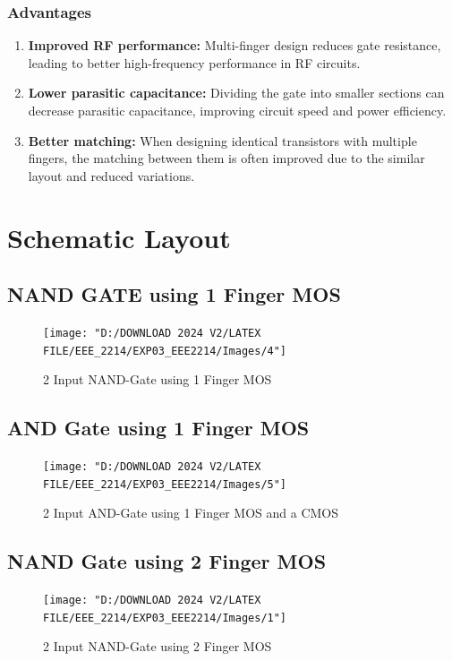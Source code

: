 \documentclass[a4paper,12pt]{article}
\begin{document}
	\subsubsection{Advantages}
	\begin{enumerate}
\item 	\textbf{Improved RF performance:} Multi-finger design reduces gate resistance, leading to better high-frequency performance in RF circuits. 
\item 	\textbf{Lower parasitic capacitance:} Dividing the gate into smaller sections can decrease parasitic capacitance, improving circuit speed and power efficiency. 
\item \textbf{	Better matching:} When designing identical transistors with multiple fingers, the matching between them is often improved due to the similar layout and reduced variations.
	\end{enumerate}

	


	\newpage
	\section{Schematic Layout }
	\subsection{NAND GATE using 1 Finger MOS}
	\begin{figure}[H]
		\centering
		\texttt{[image: "D:/DOWNLOAD 2024 V2/LATEX FILE/EEE\_2214/EXP03\_EEE2214/Images/4"]}
		\caption{2 Input NAND-Gate using 1 Finger MOS}
		\label{fig:4}
	\end{figure}
	
	\subsection{AND Gate using 1 Finger MOS}
	
	\vspace{2cm}
	\begin{figure}[H]
		\centering
		\texttt{[image: "D:/DOWNLOAD 2024 V2/LATEX FILE/EEE\_2214/EXP03\_EEE2214/Images/5"]}
		\caption{2 Input AND-Gate using 1 Finger MOS and a CMOS}
		\label{fig:5}
	\end{figure}
	\subsection{NAND Gate using 2 Finger MOS}
		\vspace{1.5cm}
	\begin{figure}[H]
		\centering
		\texttt{[image: "D:/DOWNLOAD 2024 V2/LATEX FILE/EEE\_2214/EXP03\_EEE2214/Images/1"]}
		\caption{2 Input NAND-Gate using 2 Finger MOS }
		\label{fig:1}
	\end{figure}
	
\end{document}
